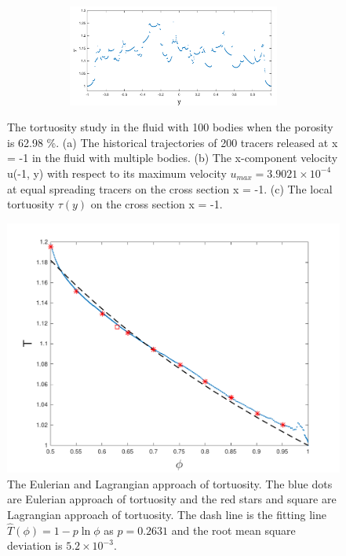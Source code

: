 \documentclass[preprint, 10pt]{elsarticle}
\begin{document}
\begin{figure}[H]
\begin{subfigure}[b]{0.45\textwidth}
\begin{subfigure}[b]{\textwidth}
\caption{}
\end{subfigure}
\begin{subfigure}[b]{\textwidth}
\includegraphics*[width =\linewidth]{./figs/tort_local100}
\caption{}
\end{subfigure}
\end{subfigure}

\caption{\label{fig:Eroding100tort} The tortuosity study in the fluid with 100 bodies 
when the porosity is 62.98 \%.
(a) The historical trajectories of 
200 tracers released at x = -1 in the fluid with multiple bodies.
(b) The 
x-component velocity u(-1, y) with respect to its maximum velocity $u_{max}=3.9021
\times 10^{-4}$ at equal spreading tracers on the cross section x = -1. 
(c) The local tortuosity $\tau(y)$ on the cross section x = -1. 
}
\end{figure}

\begin{figure}[H]
\center
\includegraphics*[width =0.5\linewidth]{./figs/tort_eulerian100}
\caption{\label{fig:Eroding100tort_all} The Eulerian and Lagrangian approach of tortuosity. 
The blue dots are Eulerian approach of tortuosity and the red stars and 
square are Lagrangian approach of tortuosity. 
The dash line is the fitting line $\hat{T}(\phi)=1-p\ln\phi$ as $p=0.2631$ and 
the root mean square deviation is $5.2 \times 10^{-3}$.}
\end{figure}
\end{document}
